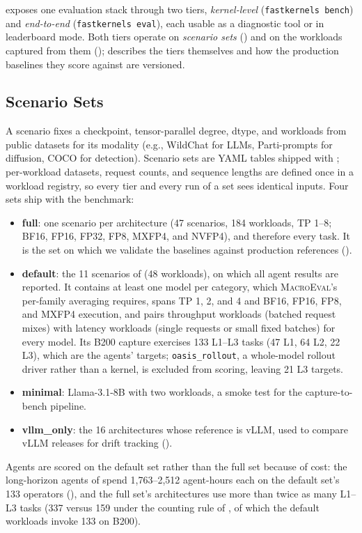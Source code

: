 \FastKernels exposes one evaluation stack through two tiers, \emph{kernel-level} (\texttt{fastkernels bench}) and \emph{end-to-end} (\texttt{fastkernels eval}), each usable as a diagnostic tool or in leaderboard mode.
Both tiers operate on \emph{scenario sets} () and on the workloads captured from them ();  describes the tiers themselves and  how the production baselines they score against are versioned.

\subsection{Scenario Sets}
\label{fastkernels:sec:scenarios}

A scenario fixes a checkpoint, tensor-parallel degree, dtype, and workloads from public datasets for its modality (e.g., WildChat for LLMs, Parti-prompts for diffusion, COCO for detection).
Scenario sets are YAML tables shipped with \FastKernels; per-workload datasets, request counts, and sequence lengths are defined once in a workload registry, so every tier and every run of a set sees identical inputs.
Four sets ship with the benchmark:
\begin{itemize}[leftmargin=*, itemsep=1pt, topsep=2pt]
\item \textbf{full}: one scenario per architecture (47 scenarios, 184 workloads, TP 1--8; BF16, FP16, FP32, FP8, MXFP4, and NVFP4), and therefore every task. It is the set on which we validate the baselines against production references ().
\item \textbf{default}: the 11 scenarios of  (48 workloads), on which all agent results are reported. It contains at least one model per category, which \textsc{MacroEval}'s per-family averaging requires, spans TP 1, 2, and 4 and BF16, FP16, FP8, and MXFP4 execution, and pairs throughput workloads (batched request mixes) with latency workloads (single requests or small fixed batches) for every model. Its B200 capture exercises 133 L1--L3 tasks (47 L1, 64 L2, 22 L3), which are the agents' targets; \texttt{oasis\_rollout}, a whole-model rollout driver rather than a kernel, is excluded from scoring, leaving 21 L3 targets.
\item \textbf{minimal}: Llama-3.1-8B with two workloads, a smoke test for the capture-to-bench pipeline.
\item \textbf{vllm\_only}: the 16 architectures whose reference is vLLM, used to compare vLLM releases for drift tracking ().
\end{itemize}
Agents are scored on the default set rather than the full set because of cost: the long-horizon agents of  spend 1{,}763--2{,}512 agent-hours each on the default set's 133 operators (), and the full set's architectures use more than twice as many L1--L3 tasks (337 versus 159 under the counting rule of , of which the default workloads invoke 133 on B200).

